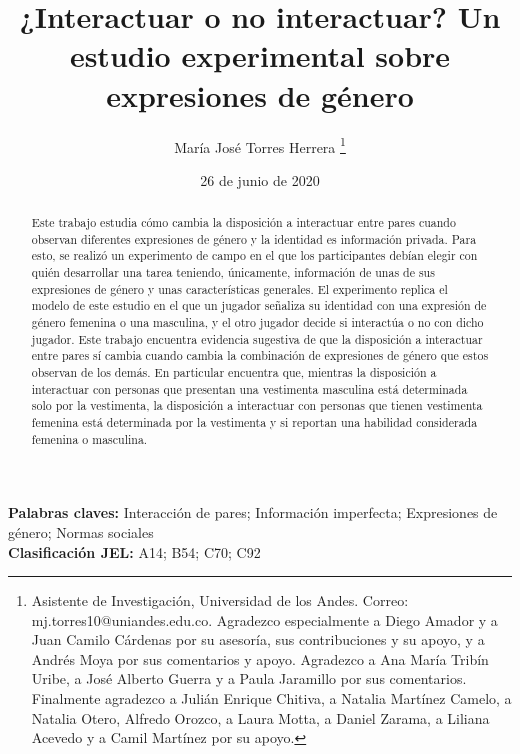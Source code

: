 \documentclass[12pt]{article}
\title{¿Interactuar o no interactuar? Un estudio experimental sobre expresiones de género}
\author{María José Torres Herrera \thanks{Asistente de Investigación, Universidad de los Andes. Correo: mj.torres10@uniandes.edu.co. Agradezco especialmente a Diego Amador y a Juan Camilo Cárdenas por su asesoría, sus contribuciones y su apoyo, y a Andrés Moya por sus comentarios y apoyo. Agradezco a Ana María Tribín Uribe, a José Alberto Guerra y a Paula Jaramillo por sus comentarios. Finalmente agradezco a Julián Enrique Chitiva, a Natalia Martínez Camelo, a Natalia Otero, Alfredo Orozco, a Laura Motta, a Daniel Zarama, a Liliana Acevedo y a Camil Martínez por su apoyo.}}
\date{26 de junio de 2020}
\begin{document}
    \begin{singlespace}    
	\maketitle
	\end{singlespace} 
\begin{abstract}
Este trabajo estudia cómo cambia la disposición a interactuar entre pares cuando observan diferentes expresiones de género y la identidad es información privada. Para esto, se realizó un experimento de campo en el que los participantes debían elegir con quién desarrollar una tarea teniendo, únicamente, información de unas de sus expresiones de género y unas características generales. El experimento replica el modelo de este estudio en el que un jugador señaliza su identidad con una expresión de género femenina o una masculina, y el otro jugador decide si interactúa o no con dicho jugador. Este trabajo encuentra evidencia sugestiva de que la disposición a interactuar entre pares sí cambia cuando cambia la combinación de expresiones de género que estos observan de los demás. En particular encuentra que, mientras la disposición a interactuar con personas que presentan una vestimenta masculina está determinada solo por la vestimenta, la disposición a interactuar con personas que tienen vestimenta femenina está determinada por la vestimenta y si reportan una habilidad considerada femenina o masculina. 
\end{abstract}
\vspace*{0.3cm}
\noindent \textbf{Palabras claves:} Interacción de pares; Información imperfecta; Expresiones de género; Normas sociales \\
\noindent \textbf{Clasificación JEL:} A14; B54; C70; C92
\vfill
\pagebreak









\vfill
\pagebreak
\begin{appendix}
    
    
    
  
    
    \vfill
    \pagebreak    
    \vfill
    \pagebreak 
\end{appendix}

\vfill
\pagebreak


\end{document}
